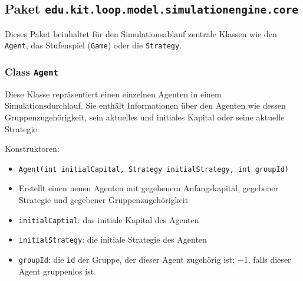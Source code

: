 \documentclass[parskip=full,11pt]{scrartcl}
\begin{document}
\subsection{Paket \texttt{edu.kit.loop.model.simulationengine.core}}
Dieses Paket beinhaltet für den Simulationsablauf zentrale Klassen wie den \texttt{Agent}, das Stufenspiel (\texttt{Game}) oder die \texttt{Strategy}.

\subsubsection{Class \texttt{Agent}}
Diese Klasse repräsentiert einen einzelnen Agenten in einem Simulationsdurchlauf. Sie enthält Informationen über den Agenten wie dessen Gruppenzugehörigkeit, sein aktuelles und initiales Kapital oder seine aktuelle Strategie.

Konstruktoren:
\begin{itemize}\itemsep -10pt
\item \texttt{Agent(int initialCapital, Strategy initialStrategy, int groupId)}
\item[] Erstellt einen neuen Agenten mit gegebenem Anfangskapital, gegebener Strategie und gegebener Gruppenzugehörigkeit
\item[] \texttt{initialCaptial}: das initiale Kapital des Agenten
\item[] \texttt{initialStrategy}: die initiale Strategie des Agenten
\item[] \texttt{groupId}: die \texttt{id} der Gruppe, der dieser Agent zugehörig ist; \(-1\), falls dieser Agent gruppenlos ist.
\end{itemize}
\end{document}
